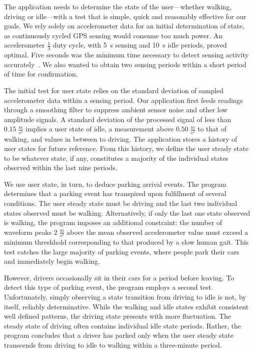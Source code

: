The application needs to determine the state of the user---whether walking,
driving or idle---with a test that is simple, quick and reasonably effective
for our goals.  We rely solely on accelerometer data for an initial
determination of state, as continuously cycled GPS sensing would consume too
much power. An accelerometer $\frac{1}{3}$ duty cycle, with 5~s sensing and
10~s idle periods, proved optimal. Five seconds was the minimum time
necessary to detect sensing activity accurately~\cite{FIXME}. We also wanted to obtain two
sensing periods within a short period of time for confirmation.

The initial test for user state relies on the standard deviation of sampled
accelerometer data within a sensing period. Our application first feeds
readings through a smoothing filter to suppress ambient sensor noise and
other low amplitude signals. A standard deviation of the processed signal of
less than $0.15\;\frac{m}{s^2}$ implies a user state of idle, a measurement
above $0.50\;\frac{m}{s^2}$ to that of walking, and values in between to
driving. The application stores a history of user states for future
reference. From this history, we define the user steady state to be whatever
state, if any, constitutes a majority of the individual states observed
within the last nine periods.

We use user state, in turn, to deduce parking arrival events. The program
determines that a parking event has transpired upon fulfillment of several
conditions. The user steady state must be driving and the last two
individual states observed must be walking. Alternatively, if only the last
one state observed is walking, the program imposes an additional constraint:
the number of waveform peaks $2\;\frac{m}{s^2}$ above the mean observed
accelerometer value must exceed a minimum threshhold corresponding to that
produced by a slow human gait. This test catches the large majority of parking
events, where people park their cars and immediately begin walking.

However, drivers occasionally sit in their cars for a period before leaving.
To detect this type of parking event, the program employs a second test.
Unfortunately, simply observing a state transition from driving to idle is
not, by itself, reliably determinative. While the walking and idle states
exhibit consistent well defined patterns, the driving state presents with
more fluctuation. The steady state of driving often contains individual idle
state periods. Rather, the program concludes that a driver has parked only
when the user steady state transcends from driving to idle to walking within
a three-minute period.

